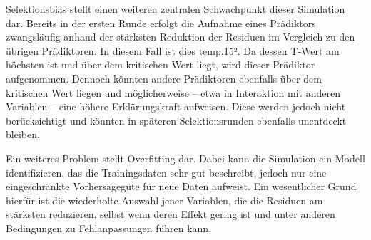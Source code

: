 Selektionsbias stellt einen weiteren zentralen Schwachpunkt dieser Simulation dar. Bereits in der
ersten Runde erfolgt die Aufnahme eines Prädiktors zwangsläufig anhand der stärksten Reduktion der
Residuen im Vergleich zu den übrigen Prädiktoren. In diesem Fall ist dies temp.15². Da dessen T-Wert
am höchsten ist und über dem kritischen Wert liegt, wird dieser Prädiktor aufgenommen. Dennoch könnten
andere Prädiktoren ebenfalls über dem kritischen Wert liegen und möglicherweise – etwa in Interaktion
mit anderen Variablen – eine höhere Erklärungskraft aufweisen. Diese werden jedoch nicht berücksichtigt
und könnten in späteren Selektionsrunden ebenfalls unentdeckt bleiben.

Ein weiteres Problem stellt Overfitting dar. Dabei kann die Simulation ein Modell identifizieren, 
das die Trainingsdaten sehr gut beschreibt, jedoch nur eine eingeschränkte Vorhersagegüte für neue Daten aufweist. 
Ein wesentlicher Grund hierfür ist die wiederholte Auswahl jener Variablen, die die Residuen am stärksten reduzieren, 
selbst wenn deren Effekt gering ist und unter anderen Bedingungen zu Fehlanpassungen führen kann.